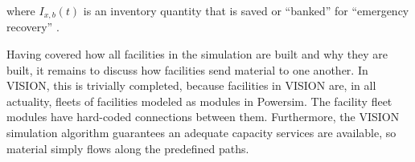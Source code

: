 where $I_{x,b}(t)$ is an inventory quantity that is saved or ``banked'' for
``emergency recovery'' \cite{schweitzer_improved_2008}.

Having covered how all facilities in the simulation are built and why they are
built, it remains to discuss how facilities send material to one another. In
VISION, this is trivially completed, because facilities in VISION are, in all
actuality, fleets of facilities modeled as modules in Powersim. The facility
fleet modules have hard-coded connections between them. Furthermore, the VISION
simulation algorithm guarantees an adequate capacity services are available, so
material simply flows along the predefined paths.
